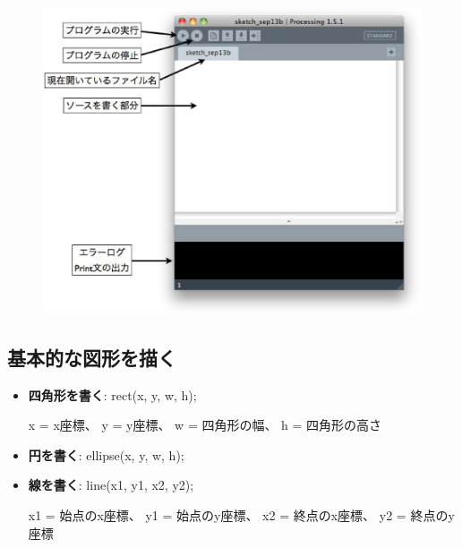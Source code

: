 \documentclass[11pt,a4paper]{jarticle}
\begin{document}
\begin{figure}[h!]
 \centering
 \includegraphics[width=0.5\columnwidth]{img/processing_ide.eps}
\end{figure}


\subsection*{基本的な図形を描く}

\begin{itemize}
 \item \textbf{四角形を書く}: rect(x, y, w, h);

       x = x座標、
       y = y座標、
       w = 四角形の幅、
       h = 四角形の高さ

 \item \textbf{円を書く}: ellipse(x, y, w, h);
 \item \textbf{線を書く}: line(x1, y1, x2, y2);
       
       x1 = 始点のx座標、
       y1 = 始点のy座標、
       x2 = 終点のx座標、
       y2 = 終点のy座標

\end{itemize}
\end{document}

